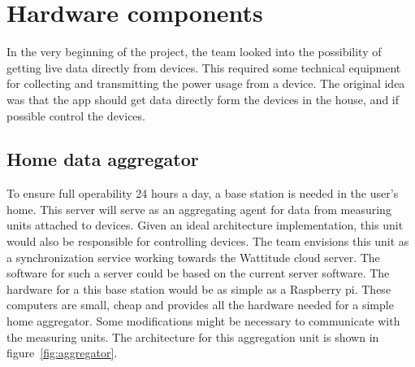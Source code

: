 \section{Hardware components}
In the very beginning of the project, the team looked into the possibility of getting live data directly from devices. This required some technical equipment for collecting and transmitting the power usage from a device. The original idea was that the app should get data directly form the devices in the house, and if possible control the devices.


\subsection{Home data aggregator}
To ensure full operability 24 hours a day, a base station is needed in the user's home. This server will serve as an aggregating agent for data from measuring units attached to devices. Given an ideal architecture implementation, this unit would also be responsible for controlling devices. The team envisions this unit as a synchronization service working towards the Wattitude cloud server. The software for such a server could be based on the current server software. The hardware for a this base station would be as simple as a Raspberry pi\cite{pi}. These computers are small, cheap and provides all the hardware needed for a simple home aggregator. Some modifications might be necessary to communicate with the measuring units. The architecture for this aggregation unit is shown in figure~\ref{fig:aggregator}.


